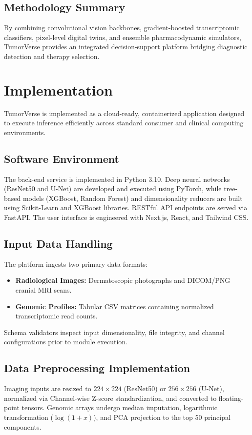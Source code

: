 \documentclass[conference]{IEEEtran}
\begin{document}
\subsection{Methodology Summary}
By combining convolutional vision backbones, gradient-boosted transcriptomic classifiers, pixel-level digital twins, and ensemble pharmacodynamic simulators, TumorVerse provides an integrated decision-support platform bridging diagnostic detection and therapy selection.

\section{Implementation}
TumorVerse is implemented as a cloud-ready, containerized application designed to execute inference efficiently across standard consumer and clinical computing environments.

\subsection{Software Environment}
The back-end service is implemented in Python 3.10. Deep neural networks (ResNet50 and U-Net) are developed and executed using PyTorch, while tree-based models (XGBoost, Random Forest) and dimensionality reducers are built using Scikit-Learn and XGBoost libraries. RESTful API endpoints are served via FastAPI. The user interface is engineered with Next.js, React, and Tailwind CSS.

\subsection{Input Data Handling}
The platform ingests two primary data formats:
\begin{itemize}
    \item \textbf{Radiological Images:} Dermatoscopic photographs and DICOM/PNG cranial MRI scans.
    \item \textbf{Genomic Profiles:} Tabular CSV matrices containing normalized transcriptomic read counts.
\end{itemize}
Schema validators inspect input dimensionality, file integrity, and channel configurations prior to module execution.

\subsection{Data Preprocessing Implementation}
Imaging inputs are resized to $224 \times 224$ (ResNet50) or $256 \times 256$ (U-Net), normalized via Channel-wise Z-score standardization, and converted to floating-point tensors. Genomic arrays undergo median imputation, logarithmic transformation ($\log(1+x)$), and PCA projection to the top 50 principal components.
\end{document}
